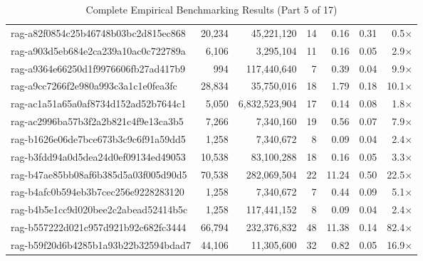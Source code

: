 \begin{table}[h!]
\begin{tabular}{lrrrrrr}
rag-a82f0854c25b46748b03bc2d815ec868 & 20,234 & 45,221,120 & 14 & 0.16 & 0.31 & 0.5$\times$ \\
rag-a903d5eb684e2ca239a10ac0c722789a & 6,106 & 3,295,104 & 11 & 0.16 & 0.05 & 2.9$\times$ \\
rag-a9364e66250d1f9976606fb27ad417b9 & 994 & 117,440,640 & 7 & 0.39 & 0.04 & 9.9$\times$ \\
rag-a9cc7266f2e980a993c3a1c1e0fea3fc & 28,834 & 35,750,016 & 18 & 1.79 & 0.18 & 10.1$\times$ \\
rag-ac1a51a65a0af8734d152ad52b7644c1 & 5,050 & 6,832,523,904 & 17 & 0.14 & 0.08 & 1.8$\times$ \\
rag-ac2996ba57b3f2a2b821c4f9e13ca3b5 & 7,266 & 7,340,160 & 19 & 0.56 & 0.07 & 7.9$\times$ \\
rag-b1626e06de7bce673b3c9c6f91a59dd5 & 1,258 & 7,340,672 & 8 & 0.09 & 0.04 & 2.4$\times$ \\
rag-b3fdd94a0d5dea24d0ef09134ed49053 & 10,538 & 83,100,288 & 18 & 0.16 & 0.05 & 3.3$\times$ \\
rag-b47ae85bb08af6b385d5a03f005d90d5 & 70,538 & 282,069,504 & 22 & 11.24 & 0.50 & 22.5$\times$ \\
rag-b4afc0b594eb3b7cec256e9228283120 & 1,258 & 7,340,672 & 7 & 0.44 & 0.09 & 5.1$\times$ \\
rag-b4b5e1cc9d020bee2c2abead52414b5c & 1,258 & 117,441,152 & 8 & 0.09 & 0.04 & 2.4$\times$ \\
rag-b557222d021c957d921b92c682fc3444 & 66,794 & 232,376,832 & 48 & 11.38 & 0.14 & 82.4$\times$ \\
rag-b59f20d6b4285b1a93b22b32594bdad7 & 44,106 & 11,305,600 & 32 & 0.82 & 0.05 & 16.9$\times$ \\
\bottomrule
\end{tabular}
\caption{Complete Empirical Benchmarking Results (Part 5 of 17)}
\end{table}

\clearpage

